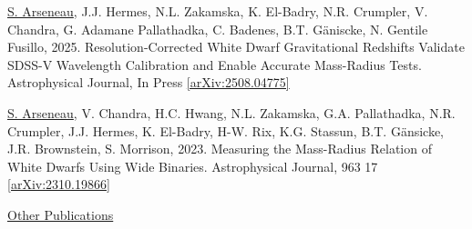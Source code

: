 \documentclass[letterpaper,11pt]{article}
\newenvironment{packed_enumerate}[1][]{
\begin{etaremune}[#1]
  \setlength{\itemsep}{3.7pt}
  \setlength{\parskip}{0pt}
  \setlength{\parsep}{0pt}}{\end{etaremune}
}
\begin{document}
\begin{packed_enumerate}

\item \underline{S. Arseneau}, J.J. Hermes, N.L. Zakamska, K. El-Badry, N.R. Crumpler, V. Chandra, G. Adamane Pallathadka, C. Badenes, B.T. G\"aniscke, N. Gentile Fusillo, 2025. Resolution-Corrected White Dwarf Gravitational Redshifts Validate SDSS-V Wavelength Calibration and Enable Accurate Mass-Radius Tests. Astrophysical Journal, In Press \href{https://arxiv.org/abs/2508.04775}{[arXiv:2508.04775]}

\item \underline{S. Arseneau}, V. Chandra, H.C. Hwang, N.L. Zakamska, G.A. Pallathadka, N.R. Crumpler, J.J. Hermes, K. El-Badry, H-W. Rix, K.G. Stassun, B.T. G\"ansicke, J.R. Brownstein, S. Morrison, 2023. Measuring the Mass-Radius Relation of White Dwarfs Using Wide Binaries. Astrophysical Journal, 963 17 \href{https://arxiv.org/abs/2310.19866}{[arXiv:2310.19866]}

\end{packed_enumerate}

\noindent
\underline{Other Publications}
\noindent
\end{document}
